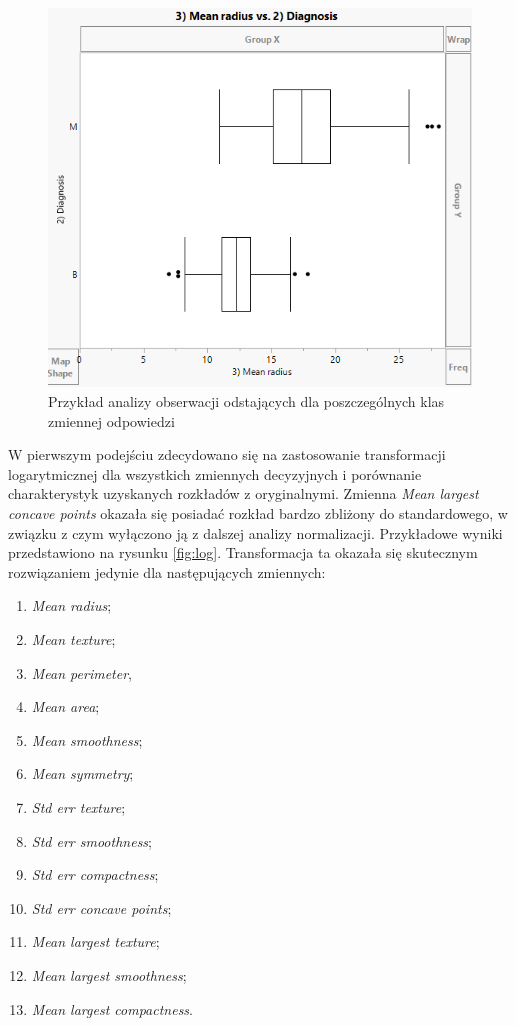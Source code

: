 	\begin{figure}[!ht]
		\centering
		\includegraphics[width=0.7\linewidth]{Rysunki/Rozdzial2/box_graph}
		\caption{Przykład analizy obserwacji odstających dla poszczególnych klas zmiennej odpowiedzi}
		\label{fig:boxgraph}
	\end{figure}

	\newpage
	
	W pierwszym podejściu zdecydowano się na zastosowanie transformacji logarytmicznej dla wszystkich zmiennych decyzyjnych i porównanie charakterystyk uzyskanych rozkładów z oryginalnymi. Zmienna \textit{Mean largest concave points} okazała się posiadać rozkład bardzo zbliżony do standardowego, w związku z czym wyłączono ją z dalszej analizy normalizacji. Przykładowe wyniki przedstawiono na rysunku \ref{fig:log}. Transformacja ta okazała się skutecznym rozwiązaniem jedynie dla następujących zmiennych:
	
	\begin{enumerate}
		\item \textit{Mean radius};
		\item \textit{Mean texture};
		\item \textit{Mean perimeter},
		\item \textit{Mean area};
		\item \textit{Mean smoothness};
		\item \textit{Mean symmetry};
		\item \textit{Std err texture};
		\item \textit{Std err smoothness};
		\item \textit{Std err compactness};
		\item \textit{Std err concave points};
		\item \textit{Mean largest texture};
		\item \textit{Mean largest smoothness};
		\item \textit{Mean largest compactness}.
	\end{enumerate}


